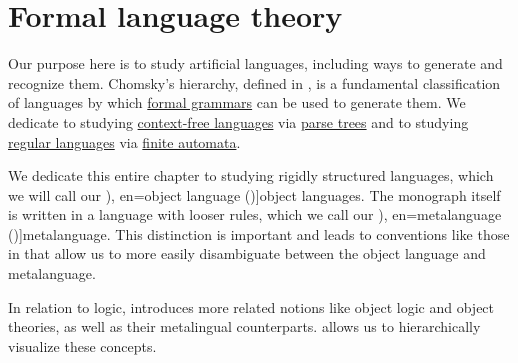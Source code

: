\chapter{Formal language theory}\label{ch:formal_language_theory}

Our purpose here is to study artificial languages, including ways to generate and recognize them. Chomsky's hierarchy, defined in , is a fundamental classification of languages by which \hyperref[def:formal_grammar]{formal grammars} can be used to generate them. We dedicate  to studying \hyperref[def:chomsky_hierarchy/context_free]{context-free languages} via \hyperref[def:parse_tree]{parse trees} and  to studying \hyperref[def:chomsky_hierarchy/regular]{regular languages} via \hyperref[def:finite_automaton]{finite automata}.

\begin{concept}\label{con:metalanguage}
  We dedicate this entire chapter to studying rigidly structured languages, which we will call our \term[ru=предметный язык (\cite[35]{Герасимов2011Вычислимость}), en=object language (\cite[3]{Kleene2002Logic})]{object languages}. The monograph itself is written in a language with looser rules, which we call our \term[ru=метаязык (\cite[35]{Герасимов2011Вычислимость}), en=metalanguage (\cite[3]{Kleene2002Logic})]{metalanguage}. This distinction is important and leads to conventions like those in  that allow us to more easily disambiguate between the object language and metalanguage.

  In relation to logic,  introduces more related notions like object logic and object theories, as well as their metalingual counterparts.  allows us to hierarchically visualize these concepts.
\end{concept}

